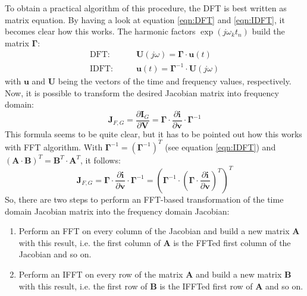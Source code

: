 \addvspace{12pt}

To obtain a practical algorithm of this procedure, the DFT is best written
as matrix equation. By having a look at equation \ref{eqn:DFT} and
\ref{eqn:IDFT}, it becomes clear how this works. The harmonic factors
$\exp(j\omega_k t_n)$ build the matrix $\boldsymbol{\Gamma}$:
\begin{align}
\text{DFT:}  \qquad & \boldsymbol{U}(j\omega) = \boldsymbol{\Gamma}\cdot \boldsymbol{u}(t) \\
\text{IDFT:} \qquad & \boldsymbol{u}(t) = \boldsymbol{\Gamma}^{-1}\cdot \boldsymbol{U}(j\omega)
\end{align}
with $\boldsymbol{u}$ and $\boldsymbol{U}$ being the vectors of the time
and frequency values, respectively. Now, it is possible to transform the
desired Jacobian matrix into frequency domain:
\begin{equation}
\boldsymbol{J}_{F,G} = \frac{\partial\boldsymbol{I}_G}{\partial\boldsymbol{V}}
  = \boldsymbol{\Gamma}\cdot\frac{\partial\boldsymbol{i}}{\partial\boldsymbol{v}}
    \cdot\boldsymbol{\Gamma}^{-1}
\end{equation}
This formula seems to be quite clear, but it has to be pointed out how
this works with FFT algorithm. With
$\boldsymbol{\Gamma}^{-1} = (\boldsymbol{\Gamma}^{-1})^T$
(see equation \ref{eqn:IDFT}) and
$(\boldsymbol{A}\cdot\boldsymbol{B})^T = \boldsymbol{B}^T\cdot \boldsymbol{A}^T$,
it follows:
\begin{equation}
\boldsymbol{J}_{F,G}
  = \boldsymbol{\Gamma}\cdot\frac{\partial\boldsymbol{i}}{\partial\boldsymbol{v}}
    \cdot\boldsymbol{\Gamma}^{-1}
  = \left( \boldsymbol{\Gamma}^{-1}\cdot \left( \boldsymbol{\Gamma} \cdot
    \frac{\partial\boldsymbol{i}}{\partial\boldsymbol{v}} \right)^T \right)^T
\end{equation}
So, there are two steps to perform an FFT-based transformation of the time
domain Jacobian matrix into the frequency domain Jacobian:
\begin{enumerate}
\item Perform an FFT on every column of the Jacobian and build a new matrix
      $\boldsymbol{A}$ with this result, i.e. the first column of
      $\boldsymbol{A}$ is the FFTed first column of the Jacobian and so on.
\item Perform an IFFT on every row of the matrix $\boldsymbol{A}$ and build
      a new matrix $\boldsymbol{B}$ with this result, i.e. the first row of
      $\boldsymbol{B}$ is the IFFTed first row of $\boldsymbol{A}$ and so on.
\end{enumerate}


